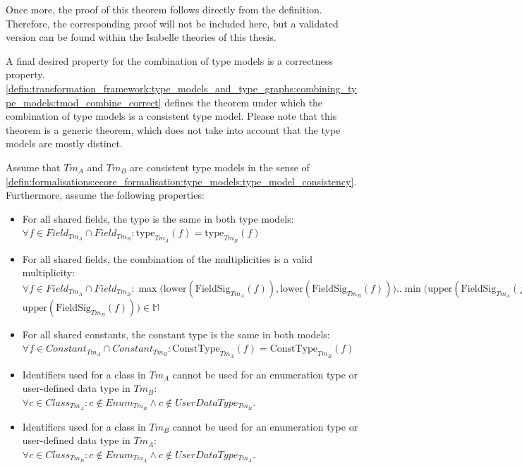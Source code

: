 Once more, the proof of this theorem follows directly from the definition. Therefore, the corresponding proof will not be included here, but a validated version can be found within the Isabelle theories of this thesis.

A final desired property for the combination of type models is a correctness property. \cref{defin:transformation_framework:type_models_and_type_graphs:combining_type_models:tmod_combine_correct} defines the theorem under which the combination of type models is a consistent type model. Please note that this theorem is a generic theorem, which does not take into account that the type models are mostly distinct.

\begin{thm}
\label{defin:transformation_framework:type_models_and_type_graphs:combining_type_models:tmod_combine_correct}
Assume that $Tm_A$ and $Tm_B$ are consistent type models in the sense of \cref{defin:formalisations:ecore_formalisation:type_models:type_model_consistency}. Furthermore, assume the following properties:
\begin{itemize}
    \item For all shared fields, the type is the same in both type models: $\forall f \in Field_{Tm_A} \cap Field_{Tm_B}\!: \mathrm{type}_{Tm_A}(f) = \mathrm{type}_{Tm_B}(f)$
    \item For all shared fields, the combination of the multiplicities is a valid multiplicity: $\forall f \in Field_{Tm_A} \cap Field_{Tm_B}\!: \max\big(\mathrm{lower}(\mathrm{FieldSig}_{Tm_A}(f)), \mathrm{lower}(\mathrm{FieldSig}_{Tm_B}(f))\big) .. \min\big(\mathrm{upper}(\mathrm{FieldSig}_{Tm_A}(f)),$\\ $\mathrm{upper}(\mathrm{FieldSig}_{Tm_B}(f))\big) \in \mathbb{M}$
    \item For all shared constants, the constant type is the same in both models: $\forall f \in Constant_{Tm_A} \cap Constant_{Tm_B}\!: \mathrm{ConstType}_{Tm_A}(f) = \mathrm{ConstType}_{Tm_B}(f)$
    \item Identifiers used for a class in $Tm_A$ cannot be used for an enumeration type or user-defined data type in $Tm_B$: $\forall c \in Class_{Tm_A}\!: c \not\in Enum_{Tm_B} \land c \not\in UserDataType_{Tm_B}$.
    \item Identifiers used for a class in $Tm_B$ cannot be used for an enumeration type or user-defined data type in $Tm_A$: $\forall c \in Class_{Tm_B}\!: c \not\in Enum_{Tm_A} \land c \not\in UserDataType_{Tm_A}$.

\end{itemize}
\end{thm}
